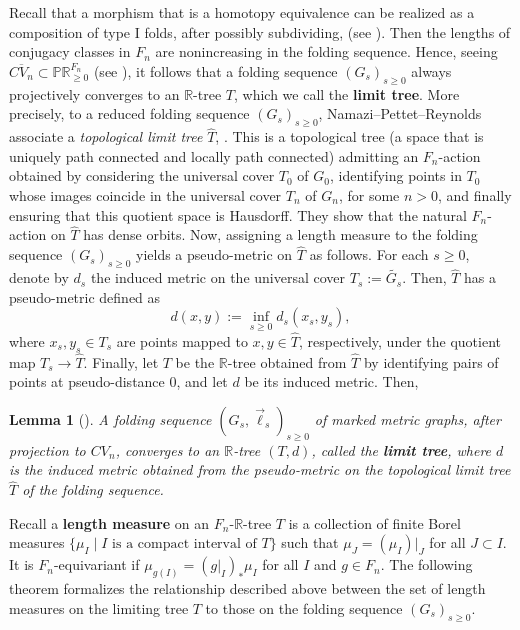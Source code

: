 \documentclass[11pt, letterpaper]{amsart}
\theoremstyle{plain}
\newtheorem{lemma}[theorem]{Lemma}
\theoremstyle{definition}
\newcommand{\R}{\mathbb{R}}
\newcommand{\ov}[1]{\overline{#1}}
\newcommand{\wt}[1]{\widetilde{#1}}
\begin{document}
Recall that a morphism that is a homotopy equivalence can be realized
as a composition of type I 
folds, after possibly
subdividing, (see ). Then the lengths
of conjugacy classes in $F_n$ 
are nonincreasing 
in the folding sequence. Hence, seeing
$\ov{CV_n} \subset \mathbb P\R_{\geq 0}^{F_n}$ (see ), it follows that 
a folding sequence $(G_s)_{s \ge 0}$ always projectively converges to an $\R$-tree
$T$, which we call the
\textbf{limit tree}. 
More precisely, to a reduced folding sequence $(G_s)_{s \ge 0}$, Namazi--Pettet--Reynolds associate a
{\it topological limit tree} $\hat{T}$, \cite[Section 5.1]{NPR2014}. This is a topological tree (a space that is uniquely path connected and locally path connected) admitting an $F_n$-action
obtained by considering the universal cover $T_0$ of $G_0$, identifying points
in $T_0$ whose images coincide in the universal cover $T_n$ of $G_n$, for some
$n > 0$, and finally ensuring that this quotient space is Hausdorff. They show
that the natural $F_n$-action on $\hat{T}$ has dense orbits.
Now, assigning a length measure to the folding sequence $(G_s)_{s \ge 0}$  yields a pseudo-metric on $\hat{T}$ as follows. For each $s \ge 0$, denote by $d_s$
the induced metric on the universal cover $T_s:=\wt{G_s}$. Then, $\hat{T}$ has a
pseudo-metric defined as
  \[
    d(x,y):= \inf_{s \ge 0}d_s(x_s,y_s),
  \]
  where $x_s,y_s \in T_s$ are points mapped to $x,y \in \hat{T}$, respectively,
  under the quotient map $T_s \to \hat{T}$. Finally, let $T$ be the $\R$-tree
  obtained from $\hat{T}$ by identifying pairs of points at pseudo-distance 0, and let $d$
  be its induced metric. Then,

\begin{lemma}[{\cite[Lemma 5.1]{NPR2014}}]\label{lem:folding_limiting_tree}
  A folding sequence $(G_s,\vec{\ell}_s)_{s \ge 0}$ of marked metric
  graphs, after projection to $CV_n$, converges to an $\R$-tree $(T,d)$, called the \textbf{limit tree},
  where $d$ is the induced metric obtained from the pseudo-metric on the topological limit
  tree $\hat{T}$ of the folding sequence.
\end{lemma}


Recall a \textbf{length measure} on an $F_n$-$\R$-tree $T$ is a collection of finite Borel measures $\{\mu_I \mid \text{$I$ is a compact interval of $T$}\}$ such that $\mu_J = (\mu_I)|_J$ for all $J \subset I$. It is $F_n$-equivariant if $\mu_{g(I)}=(g|_I)_*\mu_I$ for all $I$ and $g \in F_n$.
The following theorem formalizes the relationship described above between the set of length
measures on the limiting tree $T$ to those on the folding sequence $(G_s)_{s
  \ge 0}$.
\end{document}
